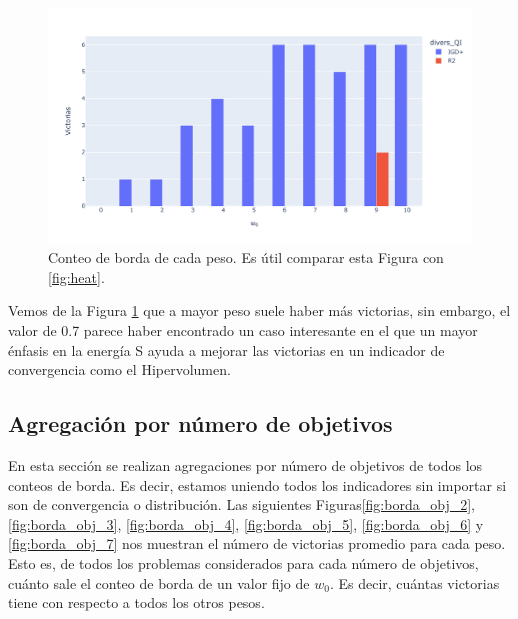 \begin{figure}[H]
    \centering
    \includegraphics[width=\textwidth]{Figuras/conteo_borda_WFG4_obj3_indhv.pdf}
    \caption[Conteo de borda]{Conteo de borda de cada peso. Es útil comparar esta Figura con \ref{fig:heat}.}
    \label{fig:borda_problema}
\end{figure}

Vemos de la Figura \ref{fig:borda_problema} que a mayor peso suele haber más victorias, sin embargo, el valor de 0.7 parece haber encontrado un caso interesante en el que un mayor énfasis en la energía S ayuda a mejorar las victorias en un indicador de convergencia como el Hipervolumen. 

\subsection{Agregación por número de objetivos}

En esta sección se realizan agregaciones por número de objetivos de todos los conteos de borda. Es decir, estamos uniendo todos los indicadores sin importar si son de convergencia o distribución. Las siguientes Figuras\ref{fig:borda_obj_2}, \ref{fig:borda_obj_3}, \ref{fig:borda_obj_4}, \ref{fig:borda_obj_5}, \ref{fig:borda_obj_6} y  \ref{fig:borda_obj_7} nos muestran el número de victorias promedio para cada peso. Esto es, de todos los problemas considerados para cada número de objetivos, cuánto sale el conteo de borda de un valor fijo de $w_0$. Es decir, cuántas victorias tiene con respecto a todos los otros pesos.   


